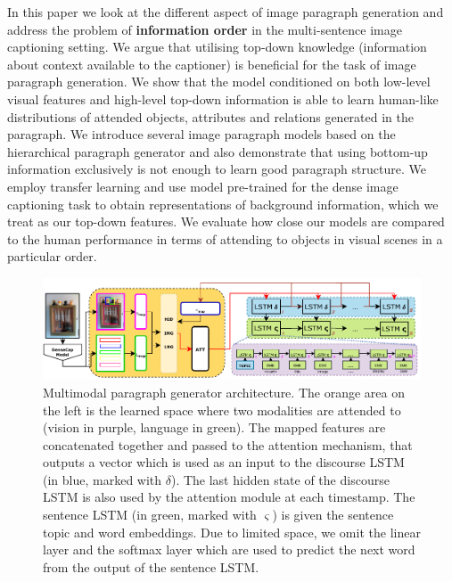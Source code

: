 \documentclass[11pt,a4paper]{article}
\begin{document}
In this paper we look at the different aspect of image paragraph generation and address the problem of \textbf{information order} in the multi-sentence image captioning setting.
We argue that utilising top-down knowledge (information about context available to the captioner) is beneficial for the task of image paragraph generation.
We show that the model conditioned on both low-level visual features and high-level top-down information is able to learn human-like distributions of attended objects, attributes and relations generated in the paragraph.
We introduce several image paragraph models based on the hierarchical paragraph generator  and also
demonstrate that using bottom-up information exclusively is not enough to learn good paragraph structure.
We employ transfer learning and use model pre-trained for the dense image captioning task \cite{densecap} to obtain representations of background information, which we treat as our top-down features.
We evaluate how close our models are compared to the human performance in terms of attending to objects in visual scenes in a particular order.

\fi



\begin{figure}[h]
 \includegraphics[width=\linewidth]{figures/model}
 \caption{Multimodal paragraph generator architecture.
 		The orange area on the left is the learned space where two modalities are attended to (vision in purple, language in green).
		The mapped features are concatenated together and passed to the attention mechanism, that outputs a vector which is used as an input to the discourse LSTM (in blue, marked with $\delta$).
		The last hidden state of the discourse LSTM is also used by the attention module at each timestamp.
		The sentence LSTM (in green, marked with $\varsigma$) is given the sentence topic and word embeddings.
		Due to limited space, we omit the linear layer and the softmax layer which are used to predict the next word from the output of the sentence LSTM.}
 \label{fig:model}
\end{figure}
\end{document}
